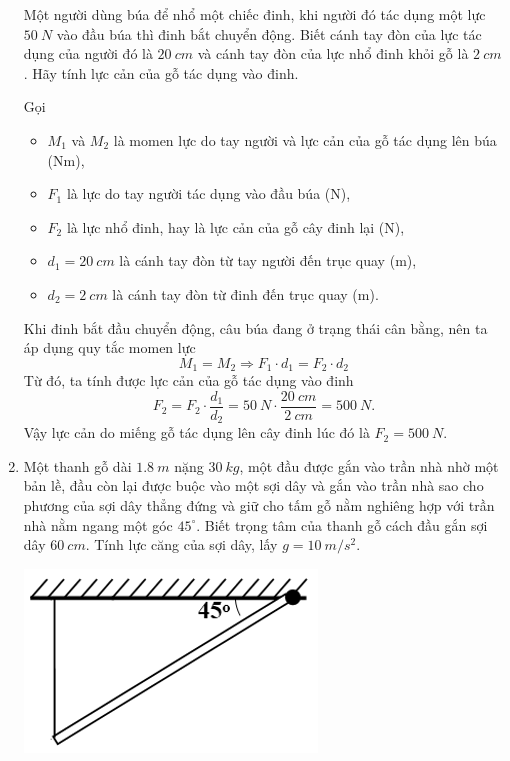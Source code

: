 \begin{enumerate}[label=\bfseries Câu \arabic*:]
	
	{Một người dùng búa để nhổ một chiếc đinh, khi người đó tác dụng một lực $\SI{50}{N}$ vào đầu búa thì đinh bắt chuyển động. Biết cánh tay đòn của lực tác dụng của người đó là $\SI{20}{cm}$ và cánh tay đòn của lực nhổ đinh khỏi gỗ là $\SI{2}{cm}$. Hãy tính lực cản của gỗ tác dụng vào đinh.
	}
	
	\hideall
	{Gọi 
		\begin{itemize}
			\item $M_1$ và $M_2$ là momen lực do tay người và lực cản của gỗ tác dụng lên búa ($\textrm{Nm}$),
			\item $F_1$ là lực do tay người tác dụng vào đầu búa ($\textrm{N}$),
			\item $F_2$ là lực nhổ đinh, hay là lực cản của gỗ cây đinh lại ($\textrm{N}$), 
			\item  $d_1=\SI{20}{cm}$ là cánh tay đòn từ tay người đến trục quay ($\textrm{m}$), 
			\item  $d_2=\SI{2}{cm}$ là cánh tay đòn từ đinh đến trục quay ($\textrm{m}$). 
		\end{itemize}
		
		Khi đinh bắt đầu chuyển động, câu búa đang ở trạng thái cân bằng, nên ta áp dụng quy tắc momen lực
		\begin{equation*}
			M_1=M_2 \Rightarrow F_1\cdot d_1 = F_2\cdot d_2
		\end{equation*}
		Từ đó, ta tính được lực cản của gỗ tác dụng vào đinh 
		\begin{equation*}
			F_2=F_2\cdot \dfrac{d_1}{d_2}
			=
			\SI{50}{N}\cdot \dfrac{\SI{20}{cm}}{\SI{2}{cm}}
			=
			\SI{500}{N}.
		\end{equation*}
		Vậy lực cản do miếng gỗ tác dụng lên cây đinh lúc đó là $F_2=\SI{500}{N}$.
	}
	\item {}
	
	
	{Một thanh gỗ dài $\SI{1,8}{m}$ nặng $\SI{30}{kg}$, một đầu được gắn vào trần nhà nhờ một bản lề, đầu còn lại được buộc vào một sợi dây và gắn vào trần nhà sao cho phương của sợi dây thẳng đứng và giữ cho tấm gỗ nằm nghiêng hợp với trần nhà nằm ngang một góc $45^{\circ}$. Biết trọng tâm của thanh gỗ cách đầu gắn sợi dây $\SI{60}{cm}$. Tính lực căng của sợi dây, lấy $g=\SI[parse-numbers=false]{10}{m/s^2}$.
		\begin{center}
			\includegraphics[scale=0.7]{../figs/VN10-2021-PH-TP021-1.png}
		\end{center} 
	}
	

\end{enumerate}

